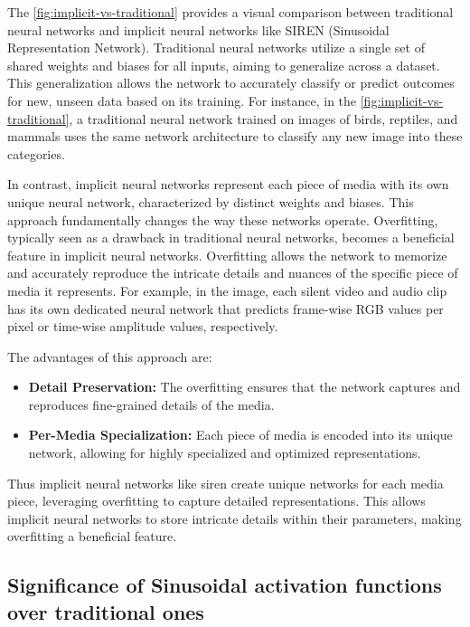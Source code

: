 \documentclass{ioereport}
\begin{document}
    The \autoref{fig:implicit-vs-traditional} provides a visual comparison between traditional neural networks and implicit neural networks like SIREN (Sinusoidal Representation Network). Traditional neural networks utilize a single set of shared weights and biases for all inputs, aiming to generalize across a dataset. This generalization allows the network to accurately classify or predict outcomes for new, unseen data based on its training. For instance, in the \autoref{fig:implicit-vs-traditional}, a traditional neural network trained on images of birds, reptiles, and mammals uses the same network architecture to classify any new image into these categories.

    In contrast, implicit neural networks represent each piece of media with its own unique neural network, characterized by distinct weights and biases. This approach fundamentally changes the way these networks operate. Overfitting, typically seen as a drawback in traditional neural networks, becomes a beneficial feature in implicit neural networks. Overfitting allows the network to memorize and accurately reproduce the intricate details and nuances of the specific piece of media it represents. For example, in the image, each silent video and audio clip has its own dedicated neural network that predicts frame-wise RGB values per pixel or time-wise amplitude values, respectively.

    The advantages of this approach are:

    \begin{itemize}
        \item \textbf{Detail Preservation:} The overfitting ensures that the network captures and reproduces fine-grained details of the media.
        \item \textbf{Per-Media Specialization:} Each piece of media is encoded into its unique network, allowing for highly specialized and optimized representations.
    \end{itemize}

    Thus implicit neural networks like \gls{siren} create unique networks for each media piece, leveraging overfitting to capture detailed representations. This allows implicit neural networks to store intricate details within their parameters, making overfitting a beneficial feature.
    
    
    \subsection{Significance of Sinusoidal activation functions over traditional ones}
\end{document}
